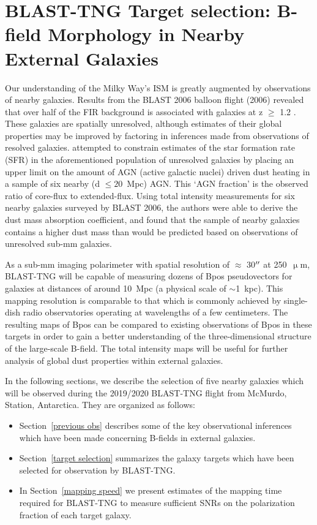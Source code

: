 \chapter{BLAST-TNG Target selection: B-field Morphology in Nearby External Galaxies}\label{galaxies}

Our understanding of the Milky Way's ISM is greatly augmented by observations of nearby galaxies. Results from the BLAST 2006 balloon flight (2006) revealed that over half of the FIR background is associated with galaxies at z $\geq$ 1.2 \citep{blast2006}. These galaxies are spatially unresolved, although estimates of their global properties may be improved by factoring in inferences made from observations of resolved galaxies. \citet{blastresolved} attempted to constrain estimates of the star formation rate (SFR) in the aforementioned population of unresolved galaxies by placing an upper limit on the amount of AGN (active galactic nuclei) driven dust heating in a sample of six nearby (d $\leq{20}$~Mpc) AGN. This `AGN fraction' is the observed ratio of core-flux to extended-flux. Using total intensity measurements for six nearby galaxies surveyed by BLAST 2006, the authors were able to derive the dust mass absorption coefficient, and found that the sample of nearby galaxies contains a higher dust mass than would be predicted based on observations of unresolved sub-mm galaxies.

As a sub-mm imaging polarimeter with spatial resolution of $\approx$ 30$\operatorname{^{\prime\prime}}$ at 250~$\upmu$m, BLAST-TNG will be capable of measuring dozens of \gls{Bpos} pseudovectors for galaxies at distances of around 10~Mpc (a physical scale of $\sim$1~kpc). This mapping resolution is comparable to that which is commonly achieved by single-dish radio observatories operating at wavelengths of a few centimeters. The resulting maps of \gls{Bpos} can be compared to existing observations of \gls{Bpos} in these targets in order to gain a better understanding of the three-dimensional structure of the large-scale B-field. The total intensity maps will be useful for further analysis of global dust properties within external galaxies.

In the following sections, we describe the selection of five nearby galaxies which will be observed during the 2019/2020 BLAST-TNG flight from McMurdo, Station, Antarctica. They are organized as follows:

\begin{itemize}[nosep]
  \item Section~\ref{previous obs} describes some of the key observational inferences which have been made concerning B-fields in external galaxies.
  \item Section~\ref{target selection} summarizes the galaxy targets which have been selected for observation by BLAST-TNG.
  \item In Section~\ref{mapping speed} we present estimates of the mapping time required for BLAST-TNG to measure sufficient SNRs on the polarization fraction of each target galaxy.
\end{itemize}

